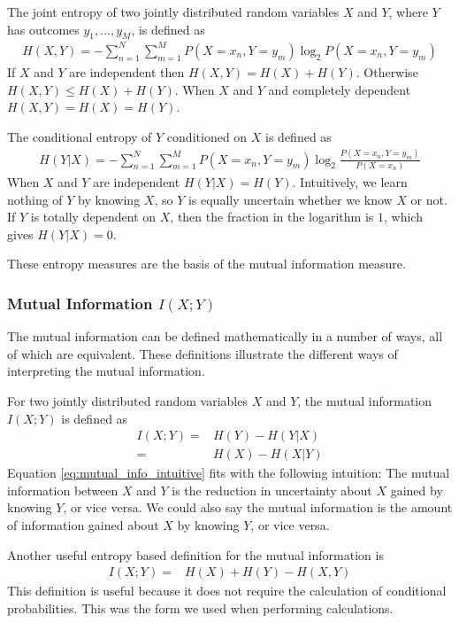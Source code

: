\documentclass[a4paper,12pt]{article}
\theoremstyle{definition}
\begin{document}
The joint entropy of two jointly distributed random variables $X$ and $Y$, where $Y$ has outcomes $y_1, \dots, y_M$, is defined as
\begin{align}\label{joint_entropy}
H(X, Y) = -\sum_{n=1}^N \sum_{m=1}^M P(X=x_n, Y=y_m) \log _2 P(X=x_n, Y=y_m)
\end{align}
If $X$ and $Y$ are independent then $H(X,Y) = H(X) + H(Y)$. Otherwise $H(X,Y) \leq H(X) + H(Y)$. When $X$ and $Y$ and completely dependent $H(X,Y) = H(X) = H(Y)$.

The conditional entropy of $Y$ conditioned on $X$ is defined as
\begin{align}
H(Y|X) = -\sum_{n=1}^N \sum_{m=1}^M P(X=x_n, Y=y_m) \log _2 \frac{P(X=x_n, Y=y_m)}{P(X=x_n)}
\end{align}
When $X$ and $Y$ are independent $H(Y|X) = H(Y)$. Intuitively, we learn nothing of $Y$ by knowing $X$, so $Y$ is equally uncertain whether we know $X$ or not. If $Y$ is totally dependent on $X$, then the fraction in the logarithm is $1$, which gives $H(Y|X) = 0$.

These entropy measures are the basis of the mutual information measure.

\subsubsection{Mutual Information $I(X;Y)$}
The mutual information can be defined mathematically in a number of ways, all of which are equivalent. These definitions illustrate the different ways of interpreting the mutual information.

For two jointly distributed random variables $X$ and $Y$, the mutual information $I(X;Y)$ is defined as
\begin{align}\label{eq:mutual_info_intuitive}
I(X;Y)  =& H(Y) - H(Y|X) \\
        =& H(X) - H(X|Y)
\end{align}
Equation \ref{eq:mutual_info_intuitive} fits with the following intuition: The mutual information between $X$ and $Y$ is the reduction in uncertainty about $X$ gained by knowing $Y$, or vice versa. We could also say the mutual information is the amount of information gained about $X$ by knowing $Y$, or vice versa.

Another useful entropy based definition for the mutual information is
\begin{align}
I(X;Y)  =& H(X) + H(Y) - H(X,Y)
\end{align}
This definition is useful because it does not require the calculation of conditional probabilities. This was the form we used when performing calculations.
\end{document}
